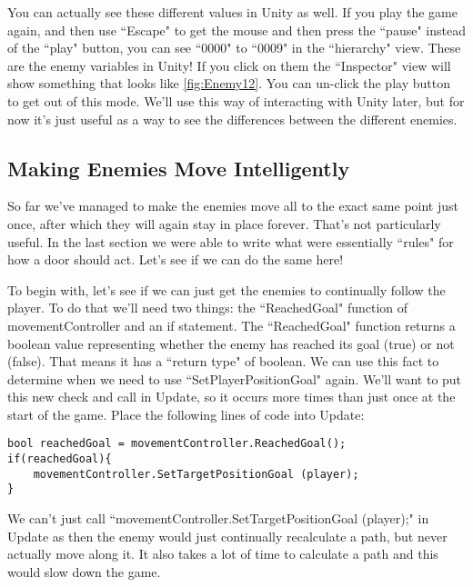 \documentclass{article}
\begin{document}
You can actually see these different values in Unity as well. If you play the game again, and then use ``Escape" to get the mouse and then press the ``pause" instead of the ``play" button, you can see ``0000" to ``0009" in the ``hierarchy" view. These are the enemy variables in Unity! If you click on them the ``Inspector" view will show something that looks like \ref{fig:Enemy12}. You can un-click the play button to get out of this mode. We'll use this way of interacting with Unity later, but for now it's just useful as a way to see the differences between the different enemies. 

\subsection{Making Enemies Move Intelligently}

So far we've managed to make the enemies move all to the exact same point just once, after which they will again stay in place forever. That's not particularly useful. In the last section we were able to write what were essentially ``rules" for how a door should act. Let's see if we can do the same here!

To begin with, let's see if we can just get the enemies to continually follow the player. To do that we'll need two things: the ``ReachedGoal" function of movementController and an if statement. The ``ReachedGoal" function returns a boolean value representing whether the enemy has reached its goal (true) or not (false). That means it has a ``return type" of boolean. We can use this fact to determine when we need to use ``SetPlayerPositionGoal" again. We'll want to put this new check and call in Update, so it occurs more times than just once at the start of the game. Place the following lines of code into Update: 

\lstset{style=sharpc}
\begin{lstlisting}
bool reachedGoal = movementController.ReachedGoal();
if(reachedGoal){
	movementController.SetTargetPositionGoal (player);
}
\end{lstlisting} 

We can't just call ``movementController.SetTargetPositionGoal (player);" in Update as then the enemy would just continually recalculate a path, but never actually move along it. It also takes a lot of time to calculate a path and this would slow down the game.

\noindent{}
\end{document}
